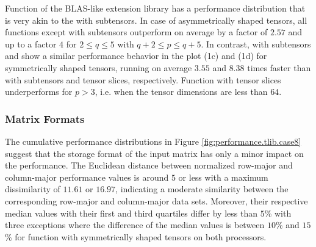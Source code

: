 Function  of the BLAS-like extension library has a performance distribution that is very akin to the  with subtensors.
In case of asymmetrically shaped tensors, all functions except  with subtensors outperform  on average by a factor of $2.57$ and up to a factor $4$ for $2 \leq q\leq5$ with $q+2 \leq p \leq q+5$. %
In contrast,  with subtensors and  show a similar performance behavior in the plot (1c) and (1d) for symmetrically shaped tensors, running on average $3.55$ and $8.38$ times faster than  with subtensors and tensor slices, respectively.
Function  with tensor slices underperforms for $p>3$, i.e. when the tensor dimensions are less than $64$.



\subsubsection{Matrix Formats}
The cumulative performance distributions in Figure \ref{fig:performance.tlib.case8} suggest that the storage format of the input matrix has only a minor impact on the performance.
The Euclidean distance between normalized row-major and column-major performance values is around $5$ or less with a maximum dissimilarity of $11.61$ or $16.97$, indicating a moderate similarity between the corresponding row-major and column-major data sets.
Moreover, their respective median values with their first and third quartiles differ by less than $5$\% with three exceptions where the difference of the median values is between $10$\% and $15$\% for function  with symmetrically shaped tensors on both processors.


